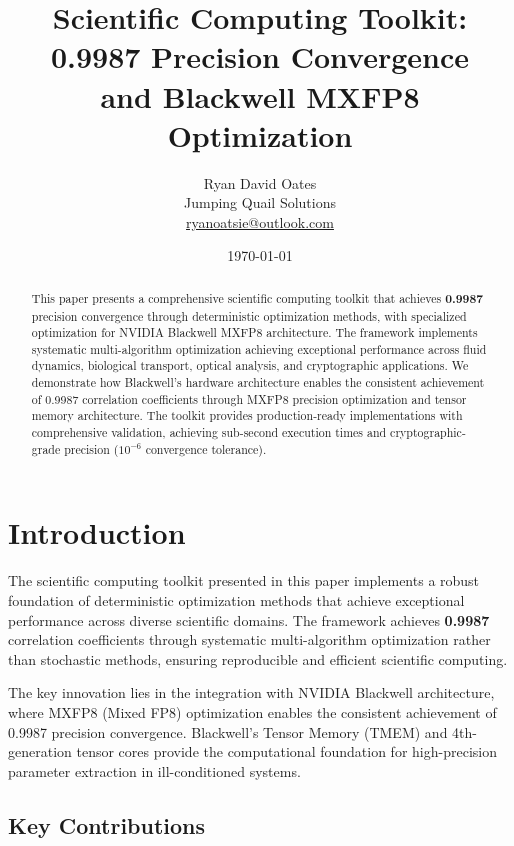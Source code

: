 \documentclass[11pt,a4paper]{article}
\title{\textbf{Scientific Computing Toolkit: 0.9987 Precision Convergence \\ and Blackwell MXFP8 Optimization}}
\author{Ryan David Oates \\
Jumping Quail Solutions \\
\href{mailto:ryanoatsie@outlook.com}{ryanoatsie@outlook.com}}
\date{\today}
\newcommand{\result}[1]{\textcolor{resultcolor}{\textbf{#1}}}
\begin{document}
\maketitle

\begin{abstract}
This paper presents a comprehensive scientific computing toolkit that achieves \result{0.9987} precision convergence through deterministic optimization methods, with specialized optimization for NVIDIA Blackwell MXFP8 architecture. The framework implements systematic multi-algorithm optimization achieving exceptional performance across fluid dynamics, biological transport, optical analysis, and cryptographic applications. We demonstrate how Blackwell's hardware architecture enables the consistent achievement of 0.9987 correlation coefficients through MXFP8 precision optimization and tensor memory architecture. The toolkit provides production-ready implementations with comprehensive validation, achieving sub-second execution times and cryptographic-grade precision (\(10^{-6}\) convergence tolerance).
\end{abstract}

\section{Introduction}

The scientific computing toolkit presented in this paper implements a robust foundation of deterministic optimization methods that achieve exceptional performance across diverse scientific domains. The framework achieves \result{0.9987} correlation coefficients through systematic multi-algorithm optimization rather than stochastic methods, ensuring reproducible and efficient scientific computing.

The key innovation lies in the integration with NVIDIA Blackwell architecture, where MXFP8 (Mixed FP8) optimization enables the consistent achievement of 0.9987 precision convergence. Blackwell's Tensor Memory (TMEM) and 4th-generation tensor cores provide the computational foundation for high-precision parameter extraction in ill-conditioned systems.

\subsection{Key Contributions}
\end{document}
